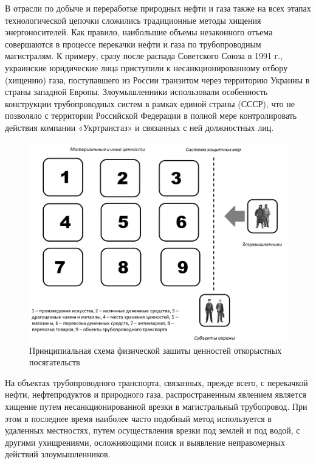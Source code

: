 \documentclass[a4paper,12pt,fleqn]{article} %
\begin{document}
В отрасли по добыче и переработке природных нефти и газа также на всех этапах технологической цепочки сложились традиционные методы хищения энергоносителей. Как правило, наибольшие объемы незаконного отъема совершаются в процессе перекачки нефти и газа по трубопроводным магистралям. К примеру, сразу после распада Советского Союза в 1991 г., украинские юридические лица приступили к несанкционированному отбору (хищению) газа, поступавшего из России транзитом через территорию Украины в страны западной Европы. Злоумышленники использовали особенность конструкции трубопроводных систем в рамках единой страны (СССР), что не позволяло с территории Российской Федерации в полной мере контролировать действия компании «Укртрансгаз» и связанных с ней должностных лиц. 

\begin{figure}[h]
	\centering
	\includegraphics[scale=0.7]{img3}
	\caption{Принципиальная схема физической зашиты ценностей откорыстных посягательств}
	\label{image3}
\end{figure}

На объектах трубопроводного транспорта, связанных, прежде всего, с перекачкой нефти, нефтепродуктов и природного газа, распространенным явлением является хищение путем несанкционированной врезки в магистральный трубопровод. При этом в последнее время наиболее часто подобный метод используется в удаленных местностях, путем осуществления врезки под землей и под водой, с другими ухищрениями, осложняющими поиск и выявление неправомерных действий злоумышленников.
\end{document}
